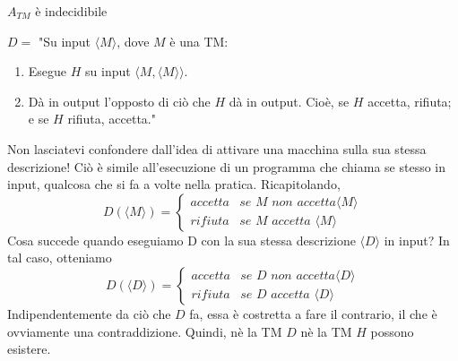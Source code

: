 \begin{Thm}{$A_{TM}$ è indecidibile}{}
\begin{demonstration}
$D=$ "Su input $\langle M\rangle$, dove $M$ è una TM:
\begin{enumerate}
    \item Esegue $H$ su input $\langle M, \langle M\rangle\rangle$.
    \item Dà in output l'opposto di ciò che $H$ dà in output. Cioè, se $H$ accetta, rifiuta; e se $H$ rifiuta, accetta."
\end{enumerate}
Non lasciatevi confondere dall'idea di attivare una macchina sulla sua stessa descrizione! Ciò è simile all'esecuzione di un programma che chiama se stesso in input, qualcosa che si fa a volte nella pratica. Ricapitolando,
\begin{equation*}D(\langle M\rangle) =
\begin{cases}
accetta& \textit{se }M\textit{ non accetta} \langle M\rangle\\ rifiuta& \textit{se }M\textit{ accetta }\langle M\rangle
\end{cases}
\end{equation*}
Cosa succede quando eseguiamo D con la sua stessa descrizione $\langle D\rangle$ in input? In tal caso, otteniamo
\begin{equation*}D(\langle D\rangle) =
\begin{cases}
accetta& \textit{se }D\textit{ non accetta} \langle D\rangle\\ rifiuta& \textit{se }D\textit{ accetta }\langle D\rangle
\end{cases}
\end{equation*}
Indipendentemente da ciò che $D$ fa, essa è costretta a fare il contrario, il che è ovviamente una contraddizione. Quindi, nè la TM $D$ nè la TM $H$ possono esistere.
\end{demonstration}


\end{Thm}
